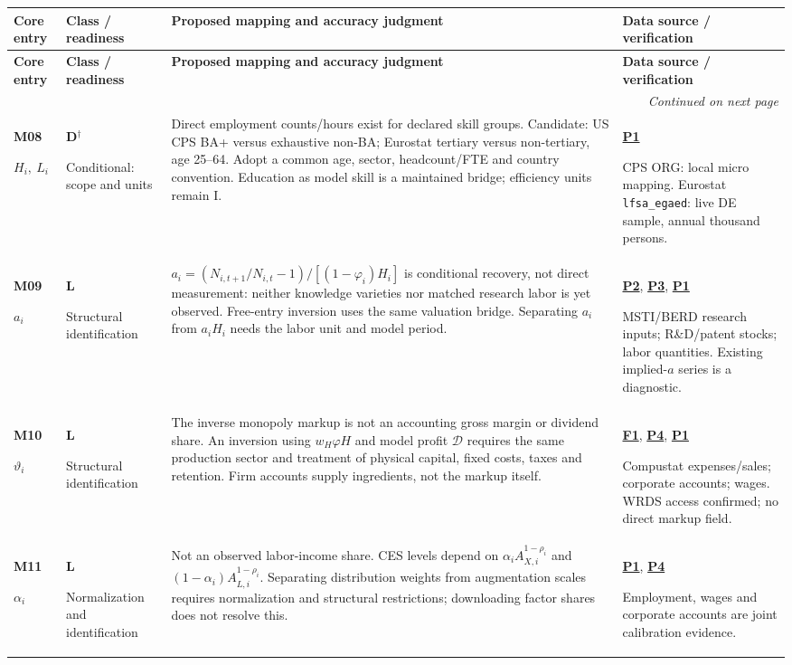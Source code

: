 \documentclass[10pt,a4paper,landscape]{article}
\makeatletter
\newcommand{\code}[1]{{\footnotesize\texttt{#1}}}
\newenvironment{measuretable}{%
\fontsize{9.4}{10.8}\selectfont\setlength{\parskip}{1pt}
\begin{longtable}{@{}P{\dimexpr .14\textwidth-4.2pt\relax}P{\dimexpr .135\textwidth-4.05pt\relax}P{\dimexpr .455\textwidth-13.65pt\relax}P{\dimexpr .27\textwidth-8.1pt\relax}@{}}
\toprule\rowcolor{tablehead}\textbf{Core entry} & \textbf{Class / readiness} & \textbf{Proposed mapping and accuracy judgment} & \textbf{Data source / verification}\\\midrule
\endfirsthead
\toprule\rowcolor{tablehead}\textbf{Core entry} & \textbf{Class / readiness} & \textbf{Proposed mapping and accuracy judgment} & \textbf{Data source / verification}\\\midrule
\endhead\midrule\multicolumn{4}{r}{\footnotesize\itshape Continued on next page}\\\endfoot
\bottomrule\endlastfoot
}{\end{longtable}}
\makeatother
\begin{document}
\begin{measuretable}
\textbf{M08}\par $H_i,\ L_i$ & \textbf{D}$^\dagger$\par Conditional: scope and units & Direct employment counts/hours exist for declared skill groups. Candidate: US CPS BA+ versus exhaustive non-BA; Eurostat tertiary versus non-tertiary, age 25--64. Adopt a common age, sector, headcount/FTE and country convention. Education as model skill is a maintained bridge; efficiency units remain I. & \hyperlink{src-P1}{\textbf{P1}}\par CPS ORG: local micro mapping. Eurostat \code{lfsa\_egaed}: live DE sample, annual thousand persons.\\[4pt]
\textbf{M09}\par $a_i$ & \textbf{L}\par Structural identification & $a_i=(N_{i,t+1}/N_{i,t}-1)/[(1-\varphi_i)H_i]$ is conditional recovery, not direct measurement: neither knowledge varieties nor matched research labor is yet observed. Free-entry inversion uses the same valuation bridge. Separating $a_i$ from $a_iH_i$ needs the labor unit and model period. & \hyperlink{src-P2}{\textbf{P2}}, \hyperlink{src-P3}{\textbf{P3}}, \hyperlink{src-P1}{\textbf{P1}}\par MSTI/BERD research inputs; R\&D/patent stocks; labor quantities. Existing implied-$a$ series is a diagnostic.\\[4pt]
\textbf{M10}\par $\vartheta_i$ & \textbf{L}\par Structural identification & The inverse monopoly markup is not an accounting gross margin or dividend share. An inversion using $w_H\varphi H$ and model profit $\mathcal D$ requires the same production sector and treatment of physical capital, fixed costs, taxes and retention. Firm accounts supply ingredients, not the markup itself. & \hyperlink{src-F1}{\textbf{F1}}, \hyperlink{src-P4}{\textbf{P4}}, \hyperlink{src-P1}{\textbf{P1}}\par Compustat expenses/sales; corporate accounts; wages. WRDS access confirmed; no direct markup field.\\[4pt]
\textbf{M11}\par $\alpha_i$ & \textbf{L}\par Normalization and identification & Not an observed labor-income share. CES levels depend on $\alpha_i A_{X,i}^{1-\rho_i}$ and $(1-\alpha_i)A_{L,i}^{1-\rho_i}$. Separating distribution weights from augmentation scales requires normalization and structural restrictions; downloading factor shares does not resolve this. & \hyperlink{src-P1}{\textbf{P1}}, \hyperlink{src-P4}{\textbf{P4}}\par Employment, wages and corporate accounts are joint calibration evidence.\\[4pt]

\end{measuretable}
\end{document}
